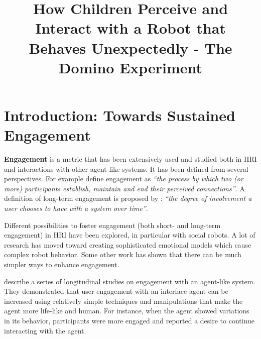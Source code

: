 \documentclass{sig-alternate}
\title{\LARGE \bf
How Children Perceive and Interact with a Robot that Behaves Unexpectedly - The Domino Experiment
}
\begin{document}
\maketitle
\begin{abstract}

\end{abstract}
\section{Introduction: Towards Sustained Engagement}

\textbf{Engagement} is a metric that has been extensively used and studied both
in HRI and interactions with other agent-like systems. It has been defined from
several perspectives. For example \cite{sidner_where_2004} define engagement as
\textit{``the process by which two (or more) participants establish, maintain
and end their perceived connections''}. A definition of long-term engagement is
proposed by \cite{bickmore_maintaining_2010}: \textit{``the degree of
involvement a user chooses to have with a system over time''}.

Different possibilities to foster engagement (both short- and long-term
engagement) in HRI have been explored, in particular with social robots. A lot
of research has moved toward creating sophisticated emotional models which cause
complex robot behavior. Some other work
\cite{bickmore_maintaining_2010,short_no_2010} has shown that there can be much
simpler ways to enhance engagement. 

\cite{bickmore_maintaining_2010} describe a series of longitudinal studies on
engagement with an agent-like system. They demonstrated that user engagement
with an interface agent can be increased using relatively simple techniques and
manipulations that make the agent more life-like and human. For instance, when
the agent showed variations in its behavior, participants were more engaged and
reported a desire to continue interacting with the agent.
\end{document}
